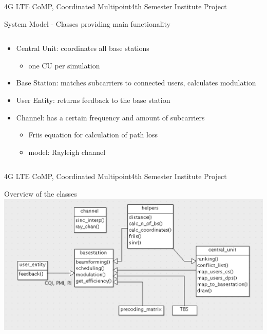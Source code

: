 \documentclass[xcolor={cmyk}]{beamer}
\begin{document}
 
  \begin{frame}{4G LTE CoMP, Coordinated Multipoint}{4th Semester Institute Project}
	 \begin{block}{System Model - Classes providing main functionality}
	 	\begin{columns}
			\begin{column}{.9\textwidth}
				\begin{itemize}
					\item Central Unit: coordinates all base stations 
						\begin{itemize}
							\item one CU per simulation
						\end{itemize}
					\item Base Station: matches subcarriers to connected users, calculates modulation
					\item User Entity: returns feedback to the base station
					\item Channel: has a certain frequency and amount of subcarriers
					\begin{itemize}
						\item Friis equation for calculation of path loss
						\item model: Rayleigh channel
					\end{itemize}
				\end{itemize}
			\end{column}
		\end{columns}
	 \end{block}
 \end{frame}
 
  \begin{frame}{4G LTE CoMP, Coordinated Multipoint}{4th Semester Institute Project}
	 \begin{block}{Overview of the classes}
		 \includegraphics[width=\linewidth,height=\textheight,keepaspectratio]{klassen.png}
	 \end{block}
 \end{frame}
\end{document}
